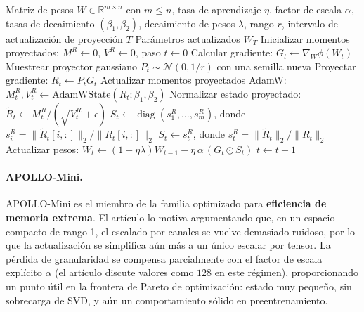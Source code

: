 \begin{algorithm}[H]
\caption{APOLLO / APOLLO-Mini Escalado de Gradiente Estructurado}
\label{alg:apollo-family}
\begin{algorithmic}[1]
\Require Matriz de pesos $W \in \mathbb{R}^{m \times n}$ con $m \le n$, tasa de aprendizaje $\eta$, factor de escala $\alpha$, tasas de decaimiento $(\beta_1, \beta_2)$, decaimiento de pesos $\lambda$, rango $r$, intervalo de actualización de proyección $T$
\Ensure Parámetros actualizados $W_T$
\State Inicializar momentos proyectados: $M^R \gets 0$, $V^R \gets 0$, paso $t \gets 0$
\Repeat
    \State Calcular gradiente: $G_t \gets \nabla_W \phi(W_t)$
        \State Muestrear proyector gaussiano $P_t \sim \mathcal{N}(0, 1/r)$ con una semilla nueva
    \EndIf
    \State Proyectar gradiente: $R_t \gets P_t G_t$ 
    \State Actualizar momentos proyectados AdamW: $M_t^R, V_t^R \gets \text{AdamWState}(R_t; \beta_1, \beta_2)$
    \State Normalizar estado proyectado: $\widetilde{R}_t \gets M_t^R / (\sqrt{V_t^R}+\epsilon)$
        \State $S_t \gets \operatorname{diag}(s_1^R, \ldots, s_m^R)$, donde $s_i^R = \|\widetilde{R}_t[i,:]\|_2 / \|R_t[i,:]\|_2$
    \Else
        \State $S_t \gets s_t^R$, donde $s_t^R = \|\widetilde{R}_t\|_2 / \|R_t\|_2$
    \EndIf
    \State Actualizar pesos: $W_t \gets (1-\eta\lambda)W_{t-1} - \eta\,\alpha\,(G_t \odot S_t)$
    \State $t \gets t+1$
\end{algorithmic}
\end{algorithm}

\paragraph{APOLLO-Mini.}
APOLLO-Mini es el miembro de la familia optimizado para \textbf{eficiencia de memoria extrema}. El artículo lo motiva argumentando que, en un espacio compacto de rango 1, el escalado por canales se vuelve demasiado ruidoso, por lo que la actualización se simplifica aún más a un único escalar por tensor. La pérdida de granularidad se compensa parcialmente con el factor de escala explícito $\alpha$ (el artículo discute valores como $128$ en este régimen), proporcionando un punto útil en la frontera de Pareto de optimización: estado muy pequeño, sin sobrecarga de SVD, y aún un comportamiento sólido en preentrenamiento.

